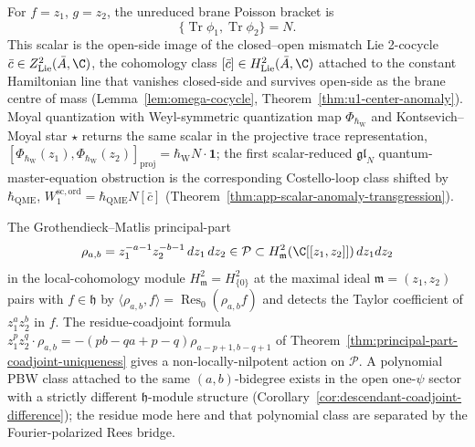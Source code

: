 \documentclass[11pt]{memoir}
\begin{document}
\begin{ex}\label{exa:linear-hamiltonians-anomaly}
  For \(f=z_1\), \(g=z_2\), the unreduced brane Poisson bracket is
  \[
    \{\operatorname{Tr}\phi_1,\operatorname{Tr}\phi_2\}=N.
  \]
  This scalar is the open-side image of the closed--open mismatch
  Lie 2-cocycle \(\bar c\in Z^2_{\mathrm{Lie}}(\bar A,\C)\), the
  cohomology class \([\bar c]\in H^2_{\mathrm{Lie}}(\bar A,\C)\)
  attached to the constant Hamiltonian line that vanishes closed-side
  and survives open-side as the brane centre of mass
  (Lemma~\ref{lem:omega-cocycle},
  Theorem~\ref{thm:u1-center-anomaly}).  Moyal quantization with
  Weyl-symmetric quantization map \(\Phi_{\hbar_{\mathrm{W}}}\) and Kontsevich--Moyal
  star \(\star\) returns the same scalar in the projective trace
  representation,
  \([\Phi_{\hbar_{\mathrm{W}}}(z_1),
    \Phi_{\hbar_{\mathrm{W}}}(z_2)]_{\mathrm{proj}}
    =\hbar_{\mathrm{W}}N\cdot\mathbf 1\); the first
  scalar-reduced \(\mathfrak{gl}_N\) quantum-master-equation
  obstruction is the corresponding Costello-loop class shifted by
  \(\hbar_{\mathrm{QME}}\),
  \(W_1^{\mathrm{sc,ord}}=\hbar_{\mathrm{QME}}N[\bar c]\)
  (Theorem~\ref{thm:app-scalar-anomaly-transgression}).
\end{ex}

\begin{ex}\label{exa:single-matlis-residue}
  The Grothendieck--Matlis principal-part
  \[
    \rho_{a,b}=z_1^{-a-1}z_2^{-b-1}\,dz_1\,dz_2
      \in\mathcal P\subset H^2_{\mathfrak m}(\C[[z_1,z_2]])\,dz_1dz_2
  \]
  in the local-cohomology module
  \(H^2_{\mathfrak m}=H^2_{\{0\}}\) at the maximal ideal
  \(\mathfrak m=(z_1,z_2)\) pairs with \(f\in\mathfrak h\) by
  \(\langle\rho_{a,b},f\rangle=\operatorname{Res}_0(\rho_{a,b}f)\) and
  detects the Taylor coefficient of \(z_1^az_2^b\) in \(f\).  The
  residue-coadjoint formula
  \(z_1^pz_2^q\cdot\rho_{a,b}=-(pb-qa+p-q)\rho_{a-p+1,b-q+1}\) of
  Theorem~\ref{thm:principal-part-coadjoint-uniqueness} gives a
  non-locally-nilpotent action on \(\mathcal P\).  A polynomial PBW class
  attached to the same \((a,b)\)-bidegree exists in the open
  one-\(\psi\) sector with a strictly different \(\mathfrak h\)-module
  structure
  (Corollary~\ref{cor:descendant-coadjoint-difference}); the residue
  mode here and that polynomial class are separated by the
  Fourier-polarized Rees bridge.
\end{ex}
\end{document}
